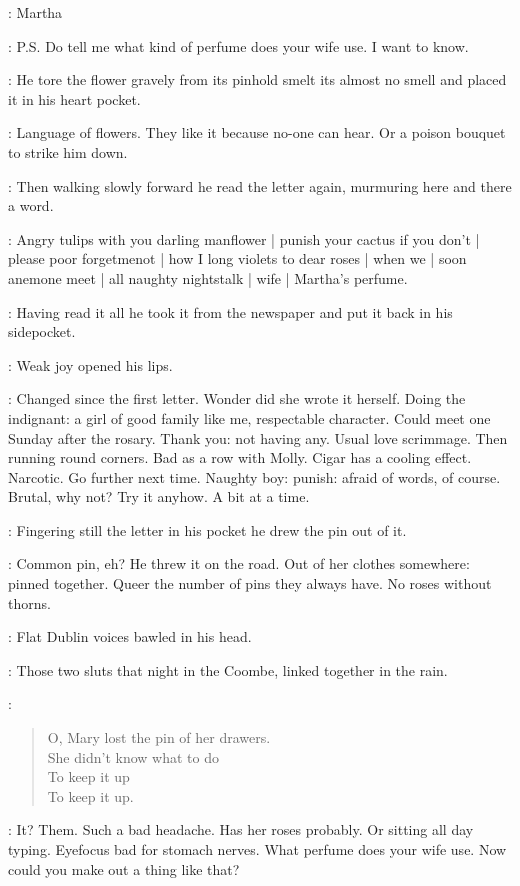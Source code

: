\martha:
Martha

\martha:
P.S. Do tell me what kind of perfume does your wife use.
I want to know.

:
He tore the flower gravely from its pinhold
smelt its almost no smell
and placed it in his heart pocket.

\BloomInt:
Language of flowers.
They like it
because no-one can hear.
Or a poison bouquet to strike him down.

:
Then walking slowly forward
he read the letter again,
murmuring here and there a word.

\BloomInt:
Angry tulips with you darling manflower |
punish your cactus if you don't |
please poor forgetmenot |
how I long violets to dear roses |
when we |
soon anemone meet |
all naughty nightstalk |
wife |
Martha's perfume.

:
Having read it all
he took it from the newspaper and put it back in his sidepocket.

:
Weak joy opened his lips.

\BloomInt:
Changed since the first letter.
Wonder did she wrote it herself.
Doing the indignant:
a girl of good family like me, respectable character.
Could meet one Sunday after the rosary.
Thank you: not having any.
Usual love scrimmage.
Then running round corners.
Bad as a row with Molly.
Cigar has a cooling effect.
Narcotic.
Go further next time.
Naughty boy:
punish:
afraid of words, of course.
Brutal, why not?
Try it anyhow.
A bit at a time.

:
Fingering still the letter in his pocket
he drew the pin out of it.

\BloomInt:
Common pin, eh?
He threw it on the road.
Out of her clothes somewhere:
pinned together.
Queer the number of pins they always have.
No roses without thorns.

:
Flat Dublin voices bawled in his head.

\BloomInt:
Those two sluts that night in the Coombe,
linked together in the rain.

\sluts:
\begin{verse}
    O, Mary lost the pin of her drawers. \\
    She didn't know what to do \\
    To keep it up \\
    To keep it up.
\end{verse}

\BloomInt:
It?
Them.
Such a bad headache.
Has her roses probably.
Or sitting all day typing.
Eyefocus bad for stomach nerves.
What perfume does your wife use.
Now could you make out a thing like that?

